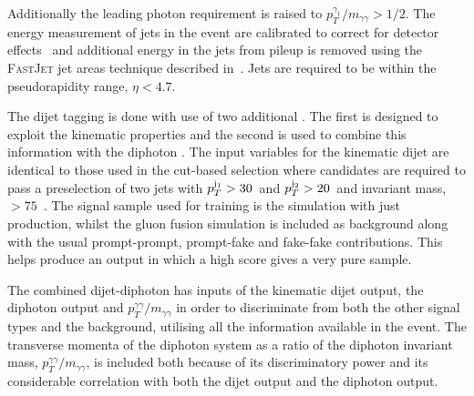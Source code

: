 Additionally the leading photon \pT requirement is raised to $p_{T}^{\gamma_{1}}/m_{\gamma\gamma}>1/2$. The energy measurement of jets in the event are calibrated to correct for detector effects~\cite{jet_energy_corrections} and additional energy in the jets from pileup is removed using the \textsc{FastJet} jet areas technique described in~\cite{pu_jets1,pu_jets2,pu_jets3}. Jets are required to be within the pseudorapidity range, $\eta<4.7$.

The dijet tagging is done with use of two additional \MVAs. The first is designed to exploit the \VBF kinematic properties and the second is used to combine this information with the diphoton \BDT. The input variables for the kinematic dijet \BDT are identical to those used in the cut-based \VBF selection where candidates are required to pass a \VBF preselection of two jets with $p_{T}^{\mathrm{j}_{1}}>30$~\GeV and $p_{T}^{\mathrm{j}_{2}}>20$~\GeV and invariant mass, \mjj$>75$~\GeV. The signal sample used for training is the \SM \MC simulation with just \VBF production, whilst the \SM gluon fusion \MC simulation is included as background along with the usual prompt-prompt, prompt-fake and fake-fake contributions. This helps produce an output in which a high score gives a very pure \VBF sample.

The combined dijet-diphoton \BDT has inputs of the kinematic dijet \BDT output, the diphoton \BDT output and $p_{T}^{\gamma\gamma}/m_{\gamma\gamma}$ in order to discriminate \VBF from both the other signal types and the background, utilising all the information available in the event. The transverse momenta of the diphoton system as a ratio of the diphoton invariant mass, $p_{T}^{\gamma\gamma}/m_{\gamma\gamma}$, is included both because of its discriminatory power and its considerable correlation with both the dijet \BDT output and the diphoton \BDT output.

